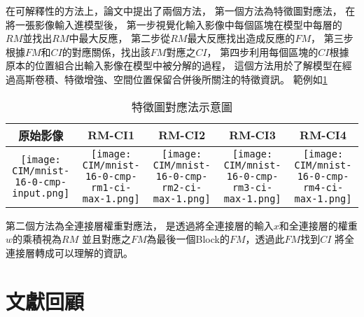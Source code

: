\documentclass[class=NCU_thesis, crop=false]{standalone}
\begin{document}
在可解釋性的方法上，論文中提出了兩個方法，
第一個方法為特徵圖對應法，
在將一張影像輸入進模型後，
第一步視覺化輸入影像中每個區塊在模型中每層的$RM$並找出$RM$中最大反應，
第二步從$RM$最大反應找出造成反應的$FM$，
第三步根據$FM$和$CI$的對應關係，找出該$FM$對應之$CI$，
第四步利用每個區塊的$CI$根據原本的位置組合出輸入影像在模型中被分解的過程，
這個方法用於了解模型在經過高斯卷積、特徵增強、空間位置保留合併後所關注的特徵資訊。
範例如\cref{tab:CIM_RMCI_example}

\begin{table}[H]
  \centering
  \begin{tabular}{| c | c | c | c | c |}
    \hline
    原始影像 & RM-CI1 & RM-CI2 & RM-CI3 & RM-CI4 \\
    \hline
    \begin{minipage}[t]{0.18\columnwidth}\centering\texttt{[image: CIM/mnist-16-0-cmp-input.png]}\end{minipage} &
    \begin{minipage}[t]{0.18\columnwidth}\centering\texttt{[image: CIM/mnist-16-0-cmp-rm1-ci-max-1.png]}\end{minipage} &
    \begin{minipage}[t]{0.18\columnwidth}\centering\texttt{[image: CIM/mnist-16-0-cmp-rm2-ci-max-1.png]}\end{minipage} &
    \begin{minipage}[t]{0.18\columnwidth}\centering\texttt{[image: CIM/mnist-16-0-cmp-rm3-ci-max-1.png]}\end{minipage} &
    \begin{minipage}[t]{0.18\columnwidth}\centering\texttt{[image: CIM/mnist-16-0-cmp-rm4-ci-max-1.png]}\end{minipage} 
    \\ \hline
    \end{tabular}
    \caption{特徵圖對應法示意圖\cite{YangCNNInterpretable}}
    \label{tab:CIM_RMCI_example}
\end{table}

第二個方法為全連接層權重對應法，
是透過將全連接層的輸入$x$和全連接層的權重$w$的乘積視為$RM$
並且對應之$FM$為最後一個Block的$FM$，透過此$FM$找到$CI$
將全連接層轉成可以理解的資訊。

\section{文獻回顧}
\end{document}
